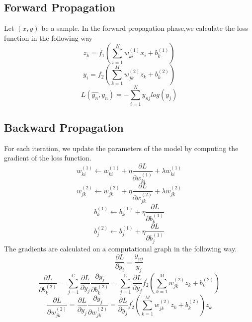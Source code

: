 \documentclass[11pt,a4paper]{article}
\begin{document}
\subsection{Forward Propagation}
Let $(x,y)$ be a sample. In the forward propagation phase,we calculate the loss function in the following way
\begin{displaymath}
z_{k}=f_{1}(\sum^{N}_{i=1}w^{(1)}_{ki}x_{i}+b^{(1)}_{k})
\end{displaymath}
\begin{displaymath}
y_{i}=f_{2}(\sum^{M}_{k=1}w^{(2)}_{jk}z_{k}+b^{(2)}_{k})
\end{displaymath}
\begin{displaymath}
L(\hat{y_{n}},y_{n})=-\sum^{N}_{i=1}y_{nj}log(y_{j})
\end{displaymath}
\subsection{Backward Propagation}
For each iteration, we update the parameters of the model by computing the gradient of the loss function.
\begin{displaymath}
w^{(1)}_{ki}\gets{}w^{(1)}_{ki} + \eta{}\frac{\partial{}L}{\partial{}w^{(1)}_{ki}}+\lambda{}w^{(1)}_{ki}
\end{displaymath}
\begin{displaymath}
w^{(2)}_{jk}\gets{}w^{(2)}_{jk} + \eta{}\frac{\partial{}L}{\partial{}w^{(2)}_{jk}}+\lambda{}w^{(2)}_{jk}
\end{displaymath}
\begin{displaymath}
b^{(1)}_{k}\gets{}b^{(1)}_{k} + \eta{}\frac{\partial{}L}{\partial{}b^{(1)}_{k}}
\end{displaymath}
\begin{displaymath}
b^{(2)}_{j}\gets{}b^{(1)}_{j} + \eta{}\frac{\partial{}L}{\partial{}b^{(1)}_{j}}
\end{displaymath}
The gradients are calculated on a computational graph in the following way.
\begin{displaymath}
\frac{\partial{}L}{\partial{}y_{i}} = \frac{y_{nj}}{y_{j}}
\end{displaymath}
\begin{displaymath}
\frac{\partial{}L}{\partial{}b^{(2)}_{k}} = \sum^{C}_{j=1}\frac{\partial{}L}{\partial{}y_{j}}\frac{\partial{}y_{j}}{\partial{}b^{(2)}_{k}}=\sum^{C}_{j=1}\frac{\partial{}L}{\partial{}y_{j}}f^{'}_{2}(\sum^{M}_{k=1}w^{(2)}_{jk}z_{k}+b^{(2)}_{k})
\end{displaymath}
\begin{displaymath}
\frac{\partial{}L}{\partial{}w^{(2)}_{jk}} = \frac{\partial{}L}{\partial{}y_{j}}\frac{\partial{}y_{j}}{\partial{}w^{(2)}_{jk}}=\frac{\partial{}L}{\partial{}y_{j}}f^{'}_{2}(\sum^{M}_{k=1}w^{(2)}_{jk}z_{k}+b^{(2)}_{k})z_{k}
\end{displaymath}
\end{document}
